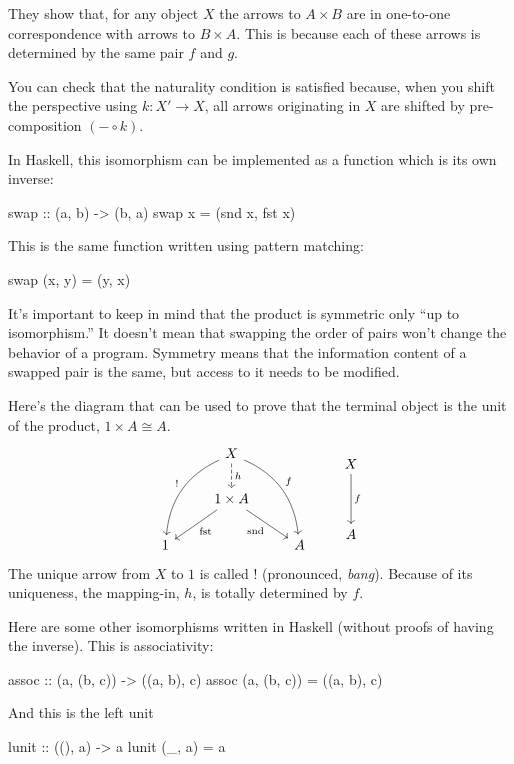 \documentclass[DaoFP]{subfiles}
\begin{document}
They show that, for any object $X$ the arrows to $A \times B$ are in one-to-one correspondence with arrows to $B \times A$. This is because each of these arrows is determined by the same pair $f$ and $g$. 

You can check that the naturality condition is satisfied because, when you shift the perspective using $k \colon X' \to X$, all arrows originating in $X$ are shifted by pre-composition $(- \circ k)$.

In Haskell, this isomorphism can be implemented as a function which is its own inverse:
\begin{haskell}
swap :: (a, b) -> (b, a)
swap x = (snd x, fst x)
\end{haskell}
This is the same function written using pattern matching:
\begin{haskell}
swap (x, y) = (y, x)
\end{haskell}

It's important to keep in mind that the product is symmetric only ``up to isomorphism.'' It doesn't mean that swapping the order of pairs won't change the behavior of a program. Symmetry means that the information content of a swapped pair is the same, but access to it needs to be modified.

Here's the diagram that can be used to prove that the terminal object is the unit of the product, $1 \times A \cong A$.
\[
 \begin{tikzcd}
 &X
 \arrow[d, dashed, "h"]
 \arrow[ddl, bend right, "!"']
 \arrow[ddr, bend left, "f"]
 \\
 & 1 \times A
  \arrow[dl,  "\text{fst}"]
 \arrow[dr,   "\text{snd}"']
 \\
1 && A
 \end{tikzcd}
 \qquad
 \begin{tikzcd}
 X
 \arrow[dd, "f"]
\\
\\
A
  \end{tikzcd}
\]
The unique arrow from $X$ to $1$ is called $!$ (pronounced, \emph{bang}). Because of its uniqueness, the mapping-in, $h$, is totally determined by $f$.


Here are some other isomorphisms written in Haskell (without proofs of having the inverse). This is associativity:
\begin{haskell}
assoc :: (a, (b, c)) -> ((a, b), c)
assoc (a, (b, c)) = ((a, b), c)
\end{haskell}
And this is the left unit
\begin{haskell}
lunit :: ((), a) -> a
lunit (_, a) = a
\end{haskell}
\end{document}
